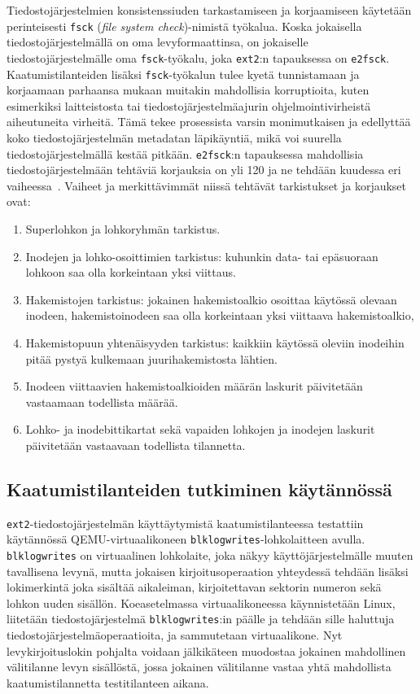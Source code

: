 Tiedostojärjestelmien konsistenssiuden tarkastamiseen ja korjaamiseen käytetään perinteisesti \texttt{fsck} (\emph{file system check})-nimistä työkalua.
Koska jokaisella tiedostojärjestelmällä on oma levyformaattinsa,
on jokaiselle tiedostojärjestelmälle oma \texttt{fsck}-työkalu,
joka \texttt{ext2}:n tapauksessa on \texttt{e2fsck}.
Kaatumistilanteiden lisäksi \texttt{fsck}-työkalun tulee kyetä tunnistamaan ja korjaamaan parhaansa mukaan muitakin mahdollisia korruptioita,
kuten esimerkiksi laitteistosta tai tiedostojärjestelmäajurin ohjelmointivirheistä aiheutuneita virheitä.
Tämä tekee prosessista varsin monimutkaisen ja edellyttää koko tiedostojärjestelmän metadatan läpikäyntiä,
mikä voi suurella tiedostojärjestelmällä kestää pitkään.
\texttt{e2fsck}:n tapauksessa mahdollisia tiedostojärjestelmään tehtäviä korjauksia on yli 120 ja ne tehdään kuudessa eri vaiheessa~\cite{SQCK}.
Vaiheet ja merkittävimmät niissä tehtävät tarkistukset ja korjaukset ovat:
%
\begin{enumerate}
      \item{Superlohkon ja lohkoryhmän tarkistus.}
      \item{Inodejen ja lohko-osoittimien tarkistus:
            kuhunkin data- tai epäsuoraan lohkoon saa olla korkeintaan yksi viittaus.}
        \item{Hakemistojen tarkistus: jokainen hakemistoalkio osoittaa käytössä olevaan inodeen, hakemistoinodeen saa olla korkeintaan yksi viittaava hakemistoalkio,}
      \item{Hakemistopuun yhtenäisyyden tarkistus: kaikkiin käytössä oleviin inodeihin pitää pystyä kulkemaan juurihakemistosta lähtien.}
      \item{Inodeen viittaavien hakemistoalkioiden määrän laskurit päivitetään vastaamaan todellista määrää.}
      \item{Lohko- ja inodebittikartat sekä vapaiden lohkojen ja inodejen laskurit päivitetään vastaavaan todellista tilannetta.}
\end{enumerate}
%

\subsection{Kaatumistilanteiden tutkiminen käytännössä}
\texttt{ext2}-tiedostojärjestelmän käyttäytymistä kaatumistilanteessa testattiin käytännössä QEMU-virtuaalikoneen \texttt{blk\-log\-writes}-lohkolaitteen avulla.
\texttt{blk\-log\-writes} on virtuaalinen lohkolaite,
joka näkyy käyttöjärjestelmälle muuten tavallisena levynä,
mutta jokaisen kirjoitusoperaation yhteydessä tehdään lisäksi lokimerkintä joka sisältää aikaleiman, kirjoitettavan sektorin numeron sekä lohkon uuden sisällön.
Koeasetelmassa virtuaalikoneessa käynnistetään Linux,
liitetään tiedostojärjestelmä \texttt{blklogwrites}:in päälle ja tehdään sille haluttuja tiedostojärjestelmäoperaatioita,
ja sammutetaan virtuaalikone.
Nyt levykirjoituslokin pohjalta voidaan jälkikäteen muodostaa jokainen mahdollinen välitilanne levyn sisällöstä,
jossa jokainen välitilanne vastaa yhtä mahdollista kaatumistilannetta testitilanteen aikana.

